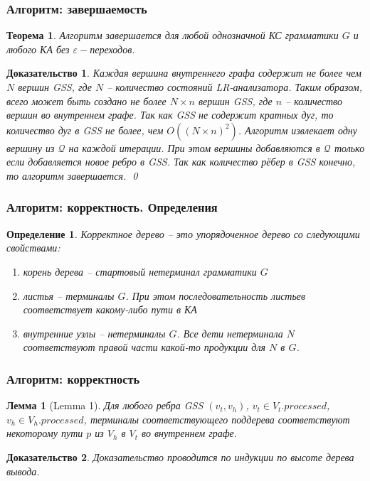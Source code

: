 \documentclass{beamer}
\newtheorem{rutheorem}{Теорема}
\newtheorem{ruproof}{Доказательство}
\newtheorem{rudefinition}{Определение}
\newtheorem{rulemma}{Лемма}
\begin{document}
\begin{frame}
    \transwipe[direction=90]
    \frametitle{Алгоритм: завершаемость}
    \begin{rutheorem}
             Алгоритм завершается для любой однозначной КС грамматики $G$ и любого КА без $\varepsilon-$переходов.
    \end{rutheorem}

    \begin{ruproof}
       Каждая вершина внутреннего графа содержит не более чем $N$ вершин GSS, где $N$ -- количество состояний LR-анализатора. Таким образом, всего может быть создано не более $N\times n$ вершин GSS, где $n$
       -- количество вершин во внутреннем графе. Так как GSS не содержит кратных дуг, то количество дуг в GSS не более, чем $O((N\times n)^2)$. Алгоритм извлекает одну вершину из  $\mathcal Q$ на каждой итерации.
       При этом вершины добавляются в $\mathcal Q$ только если добавляется новое ребро в GSS. Так как количество рёбер в GSS конечно, то алгоритм завершается.
       \qed
    \end{ruproof}

\end{frame}

\begin{frame}
    \transwipe[direction=90]
    \frametitle{Алгоритм: корректность. Определения}
    \begin{rudefinition}
         \emph{Корректное дерево} -- это упорядоченное дерево со следующими свойствами:
        \begin{enumerate}
            \item корень дерева -- стартовый нетерминал грамматики $G$
            \item листья --  терминалы $G$. При этом последовательность листьев соответствует какому-либо пути в КА
            \item внутренние узлы -- нетерминалы $G$. Все дети нетерминала $N$ соответствуют правой части какой-то продукции для $N$ в $G$.
        \end{enumerate}
    \end{rudefinition}
\end{frame}

\begin{frame}
    \transwipe[direction=90]
    \frametitle{Алгоритм: корректность}
        \begin{rulemma}[Lemma 1]
    Для любого ребра GSS $(v_{t}, v_{h})$, $v_{t} \in V_{t}.processed$, $v_{h} \in V_{h}.processed$, терминалы соответствующего поддерева соответствуют некоторому пути $p$ из $V_{h}$ в $V_{t}$ во внутреннем графе.
    \end{rulemma}

    \begin{ruproof}
        Доказательство проводится по индукции по высоте дерева вывода.
    \end{ruproof}

\end{frame}
\end{document}
